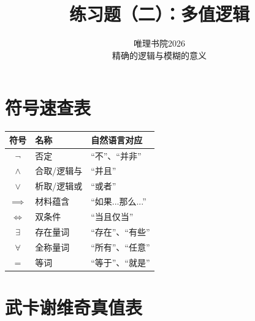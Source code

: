 \documentclass{quiz}
\title{\textbf{练习题（二）：多值逻辑}}
\author{唯理书院2026\\精确的逻辑与模糊的意义}
\date{}
\begin{document}
\maketitle


\vspace{5ex}
\section*{\centering 符号速查表}

  \begin{center}
  \begin{tabular}{cll}
    \textbf{符号} & \textbf{名称} & \textbf{自然语言对应} \\\midrule
    $\neg$ & 否定 & “不”、“并非” \\
    $\land$ & 合取/逻辑与 & “并且” \\
    $\lor$ & 析取/逻辑或 & “或者” \\
    $\implies$ & 材料蕴含 & “如果...那么...” \\
    $\iff$ & 双条件 & “当且仅当” \\
    $\exists$ & 存在量词 & “存在”、“有些” \\
    $\forall$ & 全称量词 & “所有”、“任意” \\
    $=$ & 等词 & “等于”、“就是” \\
  \end{tabular}
  \end{center}


\vspace{2ex}
\section*{\centering 武卡谢维奇真值表}
\vspace{-1.5ex}
\end{document}
